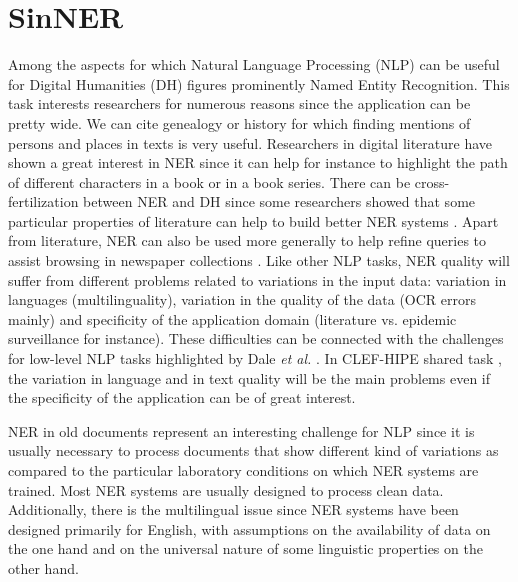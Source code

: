 \section{SinNER}

Among the aspects for which Natural Language Processing (NLP) can be useful for Digital Humanities (DH) figures prominently Named Entity Recognition. This task interests researchers for numerous reasons since the application can be pretty wide.
We can cite genealogy or history for which finding mentions of persons and places in texts is very useful. Researchers in digital literature have shown a great interest in NER since it can help for instance to highlight the path of different characters in a book or in a book series. There can be cross-fertilization between NER and DH since some researchers showed that some particular properties of literature can help to build better NER systems \cite{brooke-etal-2016-bootstrapped}.
Apart from literature, NER can also be used more generally to help refine queries to assist browsing in newspaper collections \cite{neudecker-etal-2014-large}.
Like other NLP tasks, NER quality will suffer from different problems related to variations in the input data: variation in languages (multilinguality), variation in the quality of the data (OCR errors mainly) and specificity of the application domain (literature vs. epidemic surveillance for instance). These difficulties can be connected with the challenges for low-level NLP tasks highlighted by Dale \textit{et al.} \cite{dale-etal-2000-handbook}. In CLEF-HIPE shared task \cite{ehrmann-etal-2020-extended}, the variation in language and in text quality will be the main problems even if the specificity of the application can be of great interest.

NER in old documents represent an interesting challenge for NLP since it is usually necessary to process documents that show different kind of variations as compared to the particular laboratory conditions on which NER systems are trained.
Most NER systems are usually designed to process clean data.
Additionally, there is the multilingual issue since NER systems have been designed primarily for English, with assumptions on the availability of data on the one hand and on the universal nature of some linguistic properties on the other hand.

